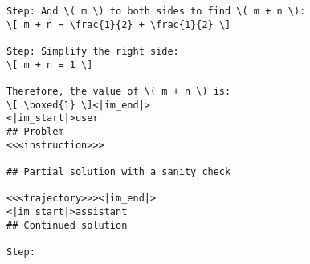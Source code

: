 \begin{tcolorbox}[brown_box, title = {{Prompt Template 1.2.1 --- Generator generates continuations for correct partial solutions}}]
\begin{verbatim}
Step: Add \( m \) to both sides to find \( m + n \):
\[ m + n = \frac{1}{2} + \frac{1}{2} \]

Step: Simplify the right side:
\[ m + n = 1 \]

Therefore, the value of \( m + n \) is:
\[ \boxed{1} \]<|im_end|>
<|im_start|>user
## Problem
<<<instruction>>>

## Partial solution with a sanity check

<<<trajectory>>><|im_end|>
<|im_start|>assistant
## Continued solution

Step:
\end{verbatim}
\end{tcolorbox}